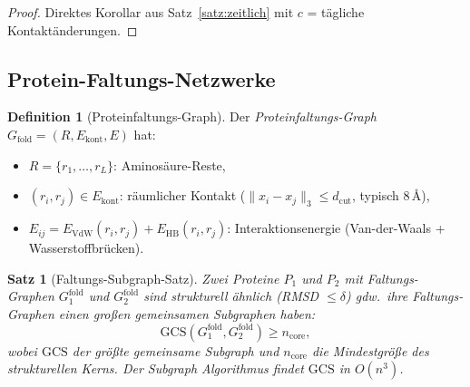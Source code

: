 ﻿\documentclass[a4paper,12pt]{article}
\theoremstyle{plain}
\newtheorem{satz}{Satz}
\theoremstyle{definition}
\newtheorem{definition}{Definition}
\theoremstyle{remark}
\begin{document}
\begin{proof}
Direktes Korollar aus Satz~\ref{satz:zeitlich} mit $c$ = t\"agliche Kontakt\"anderungen.
\end{proof}

\subsection{Protein-Faltungs-Netzwerke}

\begin{definition}[Proteinfaltungs-Graph]
\label{def:faltung}
Der \emph{Proteinfaltungs-Graph} $G_{\mathrm{fold}} = (R, E_{\mathrm{kont}}, E)$
hat:
\begin{itemize}
    \item $R = \{r_1, \ldots, r_L\}$: Aminos\"aure-Reste,
    \item $(r_i, r_j) \in E_{\mathrm{kont}}$: r\"aumlicher Kontakt
          ($\|x_i - x_j\|_3 \leq d_{\mathrm{cut}}$, typisch $8\,\text{\AA}$),
    \item $E_{ij} = E_{\mathrm{VdW}}(r_i, r_j) + E_{\mathrm{HB}}(r_i, r_j)$:
          Interaktionsenergie (Van-der-Waals + Wasserstoffbr\"ucken).
\end{itemize}
\end{definition}

\begin{satz}[Faltungs-Subgraph-Satz]
\label{satz:faltung}
Zwei Proteine $P_1$ und $P_2$ mit Faltungs-Graphen $G_1^{\mathrm{fold}}$
und $G_2^{\mathrm{fold}}$ sind \emph{strukturell \"ahnlich}
(RMSD $\leq \delta$) gdw.\ ihre Faltungs-Graphen einen gro{\ss}en
gemeinsamen Subgraphen haben:
\[
\mathrm{GCS}(G_1^{\mathrm{fold}}, G_2^{\mathrm{fold}}) \geq n_{\mathrm{core}},
\]
wobei $\mathrm{GCS}$ der gr\"o{\ss}te gemeinsame Subgraph und
$n_{\mathrm{core}}$ die Mindestgr\"o{\ss}e des strukturellen Kerns.
Der Subgraph Algorithmus findet $\mathrm{GCS}$ in $O(n^3)$.
\end{satz}
\end{document}
